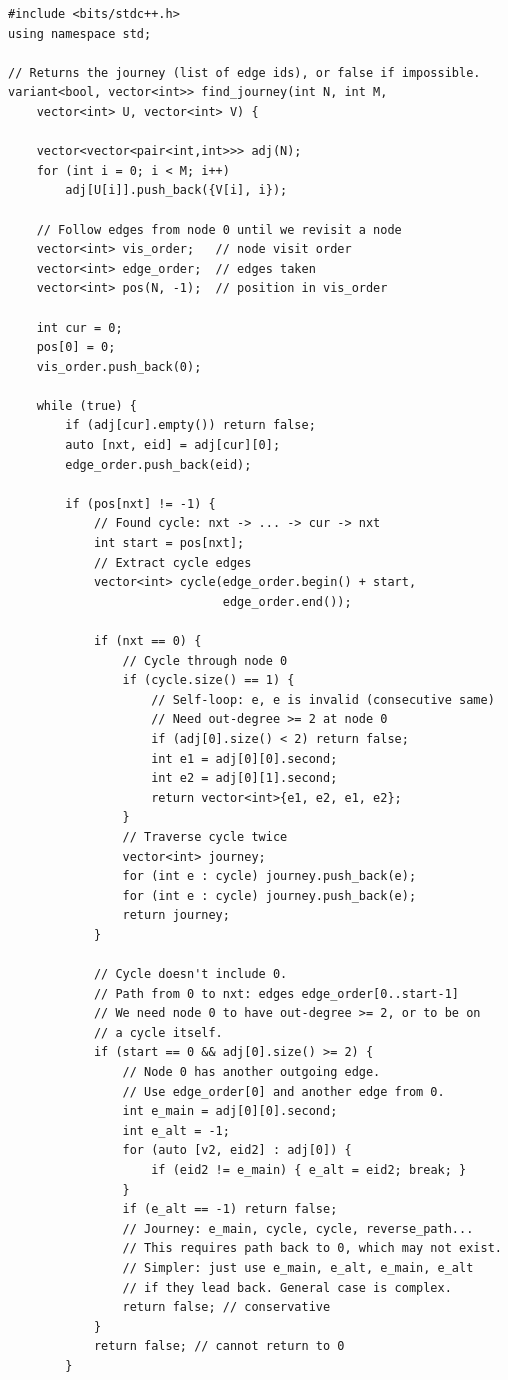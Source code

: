\documentclass[11pt,a4paper]{article}
\begin{document}
\begin{lstlisting}
#include <bits/stdc++.h>
using namespace std;

// Returns the journey (list of edge ids), or false if impossible.
variant<bool, vector<int>> find_journey(int N, int M,
    vector<int> U, vector<int> V) {

    vector<vector<pair<int,int>>> adj(N);
    for (int i = 0; i < M; i++)
        adj[U[i]].push_back({V[i], i});

    // Follow edges from node 0 until we revisit a node
    vector<int> vis_order;   // node visit order
    vector<int> edge_order;  // edges taken
    vector<int> pos(N, -1);  // position in vis_order

    int cur = 0;
    pos[0] = 0;
    vis_order.push_back(0);

    while (true) {
        if (adj[cur].empty()) return false;
        auto [nxt, eid] = adj[cur][0];
        edge_order.push_back(eid);

        if (pos[nxt] != -1) {
            // Found cycle: nxt -> ... -> cur -> nxt
            int start = pos[nxt];
            // Extract cycle edges
            vector<int> cycle(edge_order.begin() + start,
                              edge_order.end());

            if (nxt == 0) {
                // Cycle through node 0
                if (cycle.size() == 1) {
                    // Self-loop: e, e is invalid (consecutive same)
                    // Need out-degree >= 2 at node 0
                    if (adj[0].size() < 2) return false;
                    int e1 = adj[0][0].second;
                    int e2 = adj[0][1].second;
                    return vector<int>{e1, e2, e1, e2};
                }
                // Traverse cycle twice
                vector<int> journey;
                for (int e : cycle) journey.push_back(e);
                for (int e : cycle) journey.push_back(e);
                return journey;
            }

            // Cycle doesn't include 0.
            // Path from 0 to nxt: edges edge_order[0..start-1]
            // We need node 0 to have out-degree >= 2, or to be on
            // a cycle itself.
            if (start == 0 && adj[0].size() >= 2) {
                // Node 0 has another outgoing edge.
                // Use edge_order[0] and another edge from 0.
                int e_main = adj[0][0].second;
                int e_alt = -1;
                for (auto [v2, eid2] : adj[0]) {
                    if (eid2 != e_main) { e_alt = eid2; break; }
                }
                if (e_alt == -1) return false;
                // Journey: e_main, cycle, cycle, reverse_path...
                // This requires path back to 0, which may not exist.
                // Simpler: just use e_main, e_alt, e_main, e_alt
                // if they lead back. General case is complex.
                return false; // conservative
            }
            return false; // cannot return to 0
        }


\end{lstlisting}
\end{document}
